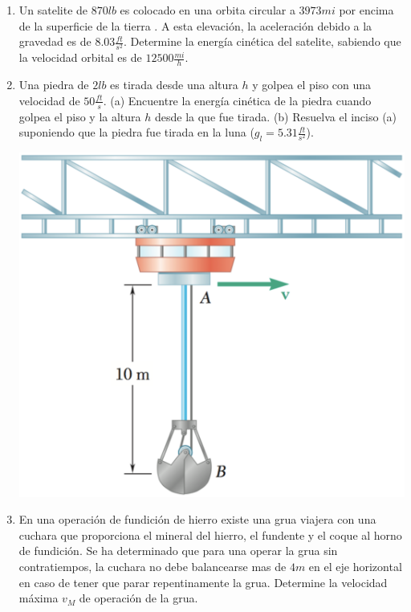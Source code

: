 \begin{enumerate}

	\item Un satelite de $870 lb$  es colocado en una orbita circular a $3973 mi$ por encima de la superficie de la tierra . A esta elevación, la aceleración debido a la gravedad es de $8.03 \frac{ft}{s^2}$. Determine la energía cinética del satelite, sabiendo que la velocidad orbital es de $12500 \frac{mi}{h}$.

	\item Una piedra de $2 lb$ es tirada desde una altura $h$ y golpea el piso con una velocidad de $50 \frac{ft}{s}$. (a) Encuentre la energía cinética de la piedra cuando golpea el piso y la altura $h$ desde la que fue tirada. (b) Resuelva el inciso (a) suponiendo que la piedra fue tirada en la luna ($g_l = 5.31 \frac{ft}{s^2}$).

	\begin{marginfigure}
		\includegraphics[width=\textwidth]{./images/grua.pdf}
	\end{marginfigure}

	\item En una operación de fundición de hierro existe una grua viajera con una cuchara que proporciona el mineral del hierro, el fundente y el coque al horno de fundición. Se ha determinado que para una operar la grua sin contratiempos, la cuchara no debe balancearse mas de $4m$ en el eje horizontal en caso de tener que parar repentinamente la grua. Determine la velocidad máxima $v_M$ de operación de la grua.


\end{enumerate}
